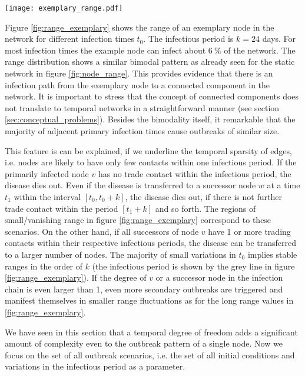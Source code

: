 \begin{SCfigure}
\texttt{[image: exemplary\_range.pdf]}
\caption{Temporal variation in the range $r_v(k,t_0)$ of an exemplary node $v$ in the network over one year.
Although the range remains rather constant for most infection times, it vanishes for certain periods.
The grey interval corresponds to the fixed infectious period $k=24$~days.
}
\label{fig:range_exemplary}
\end{SCfigure}
%
Figure \ref{fig:range_exemplary} shows the range of an exemplary node in the network for different infection times $t_0$.
The infectious period is $k=24$ days.
For most infection times the example node can infect about $6~\%$ of the network.
The range distribution shows a similar bimodal pattern as already seen for the static network in figure \ref{fig:node_range}.
This provides evidence that there is an infection path from the exemplary node to a connected component in the network.
It is important to stress that the concept of connected components does not translate to temporal networks in a straightforward manner (see section \ref{sec:conceptual_problems}).
Besides the bimodality itself, it remarkable that the majority of adjacent primary infection times cause outbreaks of similar size.

This feature is can be explained, if we underline the temporal sparsity of edges, i.e. nodes are likely to have only few contacts within one infectious period.
If the primarily infected node $v$ has no trade contact within the infectious period, the disease dies out.
Even if the disease is transferred to a successor node $w$ at a time $t_1$ within the interval $[t_0,t_0+k]$, the disease dies out, if there is not further trade contact within the period $[t_1+k]$ and so forth.
The regions of small/vanishing range in figure \ref{fig:range_exemplary} correspond to these scenarios.
On the other hand, if all successors of node $v$ have 1 or more trading contacts within their respective infectious periods, the disease can be transferred to a larger number of nodes.
The majority of small variations in $t_0$ implies stable ranges in the order of $k$ (the infectious period is shown by the grey line in figure \ref{fig:range_exemplary}).
If the degree of $v$ or a successor node in the infection chain is even larger than 1, even more secondary outbreaks are triggered and manifest themselves in smaller range fluctuations as for the long range values in \ref{fig:range_exemplary}.

We have seen in this section that a temporal degree of freedom adds a significant amount of complexity even to the outbreak pattern of a single node.
Now we focus on the set of all outbreak scenarios, i.e. the set of all initial conditions and variations in the infectious period as a parameter.
%
